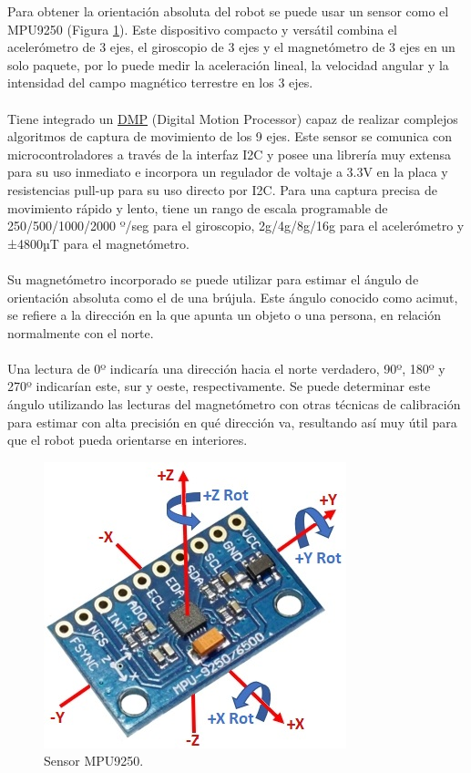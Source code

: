 Para obtener la orientación absoluta del robot se puede usar un sensor como el MPU9250 (Figura \ref{fig:mpu9250}). Este dispositivo compacto y versátil combina el acelerómetro de 3 ejes, el giroscopio de 3 ejes y el magnetómetro de 3 ejes en un solo paquete, por lo puede medir la aceleración lineal, la velocidad angular y la intensidad del campo magnético terrestre en los 3 ejes.\\ \\ Tiene integrado un \hyperlink{DMP}{DMP} (Digital Motion Processor) capaz de realizar complejos algoritmos de captura de movimiento de los 9 ejes. Este sensor se comunica con microcontroladores a través de la interfaz I2C y posee una librería muy extensa para su uso inmediato e incorpora un regulador de voltaje a 3.3V en la placa y resistencias pull-up para su uso directo por I2C. Para una captura precisa de movimiento rápido y lento, tiene un rango de escala programable de 250/500/1000/2000 º/seg para el giroscopio, 2g/4g/8g/16g para el acelerómetro y ±4800µT para el magnetómetro.\\ \\
Su magnetómetro incorporado se puede utilizar para estimar el ángulo de orientación absoluta como el de una brújula. Este ángulo conocido como acimut, se refiere a la dirección en la que apunta un objeto o una persona, en relación normalmente con el norte.\\ \\ Una lectura de 0º indicaría una dirección hacia el norte verdadero, 90º, 180º y 270º indicarían este, sur y oeste, respectivamente. Se puede determinar este ángulo utilizando las lecturas del magnetómetro con otras técnicas de calibración para estimar con alta precisión en qué dirección va, resultando así muy útil para que el robot pueda orientarse en interiores.



\begin{figure}[H]
  \centering
  \includegraphics[scale=0.7]{figs/mpu9250} %
  \caption{Sensor MPU9250.}
  \label{fig:mpu9250}
\end{figure}


